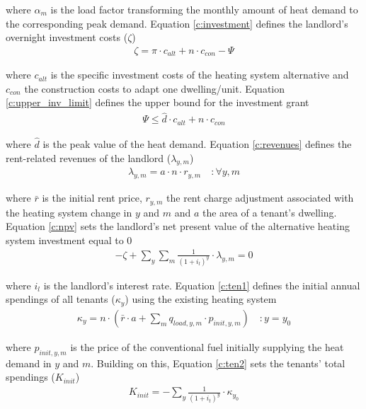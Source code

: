 where $\alpha_{m}$ is the load factor transforming the monthly amount of heat demand to the corresponding peak demand. Equation \ref{c:investment} defines the landlord's overnight investment costs ($\zeta$)
\begin{align}\label{c:investment}
\zeta = \pi \cdot c_{alt} + n \cdot c_{con} - \Psi
\end{align}

where $c_{alt}$ is the specific investment costs of the heating system alternative and $c_{con}$ the construction costs to adapt one dwelling/unit. Equation \ref{c:upper_inv_limit} defines the upper bound for the investment grant 
\begin{align}\label{c:upper_inv_limit}
\Psi \leq \hat{d} \cdot c_{alt} + n \cdot c_{con}
\end{align}

where $\hat{d}$ is the peak value of the heat demand. Equation \ref{c:revenues} defines the rent-related revenues of the landlord ($\lambda_{y,m}$)
\begin{align}\label{c:revenues}
\lambda_{y,m} = a \cdot n \cdot r_{y,m} \quad :\forall y,m
\end{align}

where $\bar{r}$ is the initial rent price, $r_{y,m}$ the rent charge adjustment associated with the heating system change in $y$ and $m$ and $a$ the area of a tenant's dwelling. Equation \ref{c:npv} sets the landlord's net present value of the alternative heating system investment equal to 0
\begin{align}\label{c:npv}
-\zeta + \sum_{y} \sum_{m} \frac{1}{(1+i_l)^y} \cdot \lambda_{y,m} = 0
\end{align}

where $i_l$ is the landlord's interest rate. Equation \ref{c:ten1} defines the initial annual spendings of all tenants ($\kappa_{y}$) using the existing heating system 
\begin{align}\label{c:ten1}
\kappa_{y} = n \cdot (\bar{r} \cdot a + \sum_{m} q_{load,y,m} \cdot p_{init,y,m}) \quad :y=y_0
\end{align}

where $p_{init,y,m}$ is the price of the conventional fuel initially supplying the heat demand in $y$ and $m$. Building on this, Equation \ref{c:ten2} sets the tenants' total spendings ($K_{init}$)
\begin{align}\label{c:ten2}
K_{init} = -\sum_{y} \frac{1}{(1+i_{t})^y} \cdot \kappa_{y_0}
\end{align}

